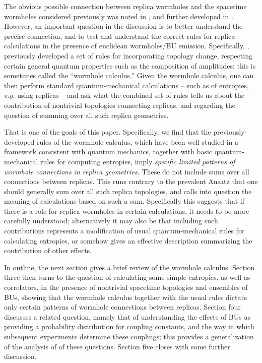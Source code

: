 \documentclass[12pt]{article}
\numberwithin{equation}{section}
\begin{document}
The obvious possible connection between replica wormholes and the spacetime wormholes considered previously was noted in \cite{Penington:2019kki, Almheiri:2019qdq}, and further developed in \cite{Marolf:2020xie}.  However,  an important question in the discussion is to better understand the precise connection, and to test and understand the correct rules for replica calculations in the presence of euclidean wormholes/BU emission.  Specifically,  \cite{GiStInc},\cite{Cole} previously developed a set of rules for incorporating topology change, respecting certain general quantum properties such as the composition of amplitudes; this is sometimes called the ``wormhole calculus."  Given the wormhole calculus, one can then perform standard quantum-mechanical calculations -- such as of entropies, {\it e.g.} using replicas -- and ask what the combined set of rules tells us about the contribution of nontrivial topologies connecting replicas, and  regarding the question of summing over all such replica geometries.

That is one of the goals of this paper.  Specifically, we find that the previously-developed  rules of the wormhole calculus, which have been well studied in a framework consistent with quantum mechanics,  together with basic quantum-mechanical rules for computing entropies, imply {\it specific limited patterns of wormhole connections in replica geometries.}  These do not include sums over all connections between replicas. This runs contrary to the prevalent Ansatz that one should generally sum over all such replica topologies\cite{Penington:2019kki, Almheiri:2019qdq}, and calls into question the meaning of calculations based on such a sum.   Specifically this suggests that if there is a role for replica wormholes in certain calculations, it needs to be more carefully understood; alternatively it may also be that including such contributions represents a modification of usual quantum-mechanical rules for calculating entropies, or somehow gives an effective description summarizing the contribution of other effects.

In outline, the next section gives a brief review of the wormhole calculus.  Section three then turns to the question of calculating some simple entropies, as well as correlators, in the presence of nontrivial spacetime topologies and ensembles of BUs, showing that the wormhole calculus together with the usual rules dictate only certain patterns of wormhole connections between replicas.  Section four discusses a related question, namely that of understanding the effects of BUs as providing a probability distribution for coupling constants, and the way in which subsequent experiments determine these couplings; this provides a generalization of the analysis of \cite{Cole,GiStInc} of these questions.  Section five closes with some further discussion.
\end{document}
